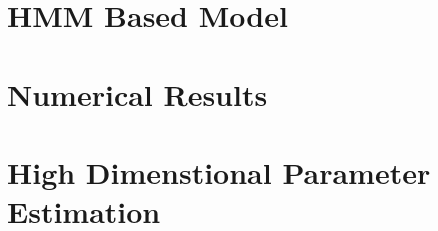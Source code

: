 \section{HMM Based Model}

\section{Numerical Results}

\section{High Dimenstional Parameter Estimation}